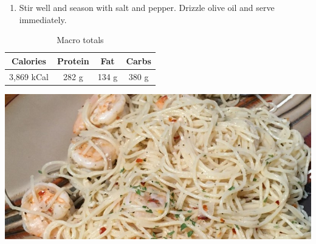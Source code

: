 \begin{multicols}{2}
\begin{enumerate}
 \item Stir well and season with salt and pepper. Drizzle olive oil and serve immediately.   
\end{enumerate}
\begin{table}[H]
  \begin{center}
    \caption{Macro totals}
    \label{tab:table1}
    \begin{tabular}{c|c|c|c} %
      \textbf{Calories} & \textbf{Protein} & \textbf{Fat} & \textbf{Carbs}\\
      \hline
      3,869 kCal & 282 g & 134 g & 380 g\\
    \end{tabular}
  \end{center}
\end{table}
\end{multicols}



\begin{center}
\includegraphics[scale=0.65]{Pasta/Shrimp Scampi/Shrimp Scampi.jpg}
\end{center}
